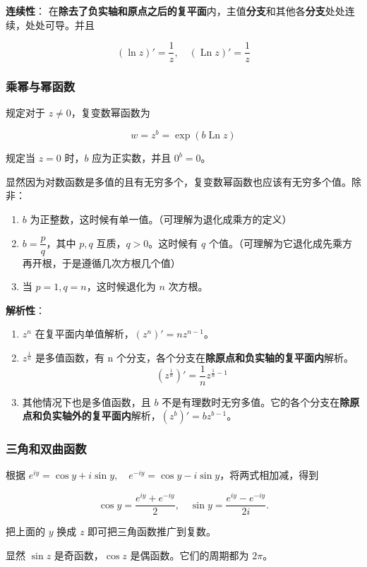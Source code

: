 \textbf{连续性}：
在\textbf{除去了负实轴和原点之后的复平面}内，主值\textbf{分支}和其他各\textbf{分支}处处连续，处处可导。并且

\[
(\ln z)'=\frac{1}{z},\quad (\operatorname{Ln}z)'=\frac{1}{z}
\]
\subsubsection{乘幂与幂函数}
\label{乘幂与幂函数}
规定对于 \(z \ne 0\)，复变数幂函数为

\[
w=z^b=\exp(b\operatorname{Ln}z)
\]

规定当 \(z=0\) 时，\(b\) 应为正实数，并且 \(0^b=0\)。

显然因为对数函数是多值的且有无穷多个，复变数幂函数也应该有无穷多个值。除非：

\begin{enumerate}
\item \(b\) 为正整数，这时候有单一值。（可理解为退化成乘方的定义）
\item \(b=\dfrac{p}{q}\)，其中 \(p,q\) 互质，\(q>0\)。这时候有 \(q\)
个值。（可理解为它退化成先乘方再开根，于是遵循几次方根几个值）
\item 当 \(p=1,q=n\)，这时候退化为 \(n\) 次方根。
\end{enumerate}

\textbf{解析性}：

\begin{enumerate}
\item \(z^n\) 在复平面内单值解析，\(\left(z^n\right)'=nz^{n-1}\)。
\item \(z^{\frac{1}{n}}\)
是多值函数，有 n 个分支，各个分支在\textbf{除原点和负实轴的复平面内}解析。 \[
    \left(z^{\frac{1}{n}}\right)'=\frac{1}{n}z^{\frac{1}{n}-1}
    \]
\item 其他情况下也是多值函数，且 \(b\)
不是有理数时无穷多值。它的各个分支在\textbf{除原点和负实轴外的复平面内}解析，\(\left(z^b\right)'=bz^{b-1}\)。
\end{enumerate}
\subsubsection{三角和双曲函数}
\label{三角和双曲函数}
根据
\(e^{iy}=\cos y+i\sin y,\quad e^{-iy}=\cos y-i\sin y\)，将两式相加减，得到

\[
\cos y=\frac{e^{iy}+e^{-iy}}{2},\quad \sin y=\frac{e^{iy}-e^{-iy}}{2i}.
\]

把上面的 \(y\) 换成 \(z\) 即可把三角函数推广到复数。

显然 \(\sin z\) 是奇函数，\(\cos z\) 是偶函数。它们的周期都为 \(2\pi\)。

